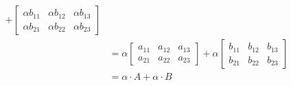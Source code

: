 \begin{exemplo}
\begin{enumerate}[label={\arabic*})]
\begin{solucao}
\begin{itemize}
\begin{align*}
                      + \begin{bmatrix} \alpha b_{11} & \alpha b_{12} & \alpha b_{13}\\ \alpha b_{21} & \alpha b_{22} & \alpha b_{23} \end{bmatrix}
                      \\ &= \alpha\begin{bmatrix} a_{11} & a_{12} & a_{13}\\a_{21} & a_{22} & a_{23}\end{bmatrix} +
                      \alpha\begin{bmatrix} b_{11} & b_{12} & b_{13}\\b_{21} & b_{22} & b_{23}\end{bmatrix}
                      \\ &= \alpha\cdot A + \alpha\cdot B
                    \end{align*}


\end{itemize}
\end{solucao}
\end{enumerate}
\end{exemplo}
